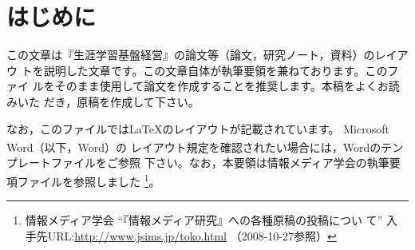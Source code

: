 \documentclass[b5paper,10pt,twocolumn,tombow]{jarticle}
\begin{document}


\tableofcontents{}
\bigskip{}

\section{はじめに}
この文章は『生涯学習基盤経営』の論文等（論文，研究ノート，資料）のレイアウ
トを説明した文章です。この文章自体が執筆要領を兼ねております。このファイ
ルをそのまま使用して論文を作成することを推奨します。本稿をよくお読みいた
だき，原稿を作成して下さい。


なお，このファイルでは\LaTeX{}のレイアウトが記載されています。
Microsoft Word\textsuperscript{\textregistered}（以下，Word）の
レイアウト規定を確認されたい場合には，Wordのテンプレートファイルをご参照
下さい。なお，本要領は情報メディア学会の執筆要項ファイルを参照しました
\footnote{情報メディア学会 ``『情報メディア研究』への各種原稿の投稿につい
て'' 入手先URL:\url{http://www.jsims.jp/toko.html} （2008-10-27参照）}。
\end{document}

